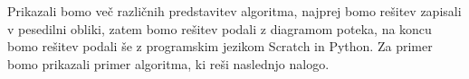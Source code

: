 
Prikazali bomo več različnih predstavitev algoritma, najprej bomo
rešitev zapisali v pesedilni obliki, zatem bomo rešitev podali z
diagramom poteka, na koncu bomo rešitev podali še z programskim
jezikom Scratch in Python.  Za primer bomo prikazali primer algoritma,
ki reši naslednjo nalogo.



